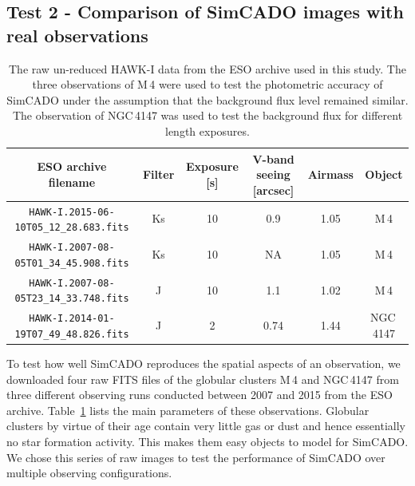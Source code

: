 \subsection{Test 2 - Comparison of SimCADO images with real observations}
\label{subsec:HAWKI_comparison}

\begin{table}

    \centering
    \caption{The raw un-reduced HAWK-I data from the ESO archive used in this study.
    The three observations of M\,4 were used to test the photometric accuracy of SimCADO under the assumption that the background flux level remained similar.
    The observation of NGC\,4147 was used to test the background flux for different length exposures.}
    \label{tab:HAWKI_raw}
    \begin{tabular}{c c c c c c }
        \hline\hline
        ESO archive filename                        & Filter & Exposure [s] & V-band seeing [arcsec]    &  Airmass  & Object  \\
        \hline
        \verb+HAWK-I.2015-06-10T05_12_28.683.fits+   & Ks     &  10          &  0.9                      &  1.05     & M\,4    \\
        \verb+HAWK-I.2007-08-05T01_34_45.908.fits+   & Ks     &  10          &  NA                       &  1.05     & M\,4    \\
        \verb+HAWK-I.2007-08-05T23_14_33.748.fits+   & J      &  10          &  1.1                      &  1.02     & M\,4    \\
        \hline
        \verb+HAWK-I.2014-01-19T07_49_48.826.fits+   & J      &  2           &  0.74                     &  1.44     & NGC\,4147    \\
        \hline
    \end{tabular}
    
\end{table}


To test how well SimCADO reproduces the spatial aspects of an observation, we downloaded four raw FITS files of the globular clusters M\,4 and NGC\,4147 from three different observing runs conducted between 2007 and 2015 from the ESO archive.
Table~\ref{tab:HAWKI_raw} lists the main parameters of these observations.
Globular clusters by virtue of their age contain very little gas or dust and hence essentially no star formation activity.
This makes them easy objects to model for SimCADO.
We chose this series of raw images to test the performance of SimCADO over multiple observing configurations. 

